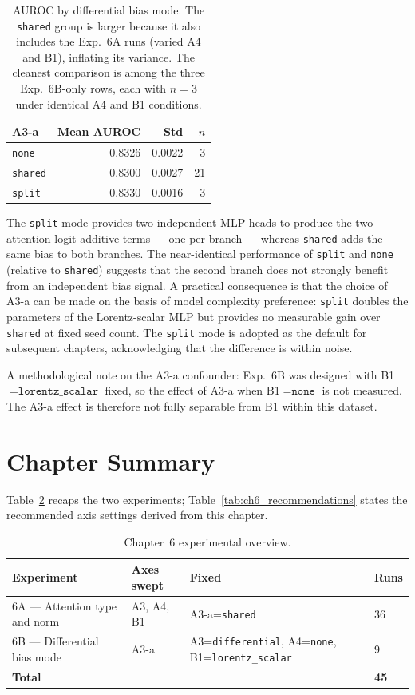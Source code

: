 \begin{table}[h]
\centering\small
\begin{tabular}{lrrr}
\toprule
A3-a & Mean AUROC & Std & $n$ \\
\midrule
\texttt{none}   & 0.8326 & 0.0022 & 3  \\
\texttt{shared} & 0.8300 & 0.0027 & 21 \\
\texttt{split}  & 0.8330 & 0.0016 & 3  \\
\bottomrule
\end{tabular}
\caption{AUROC by differential bias mode. The \texttt{shared} group is larger
  because it also includes the Exp.~6A runs (varied A4 and B1), inflating its
  variance. The cleanest comparison is among the three Exp.~6B-only rows, each
  with $n=3$ under identical A4 and B1 conditions.}
\label{tab:ch6_A3a_results}
\end{table}

The \texttt{split} mode provides two independent MLP heads to produce the two
attention-logit additive terms — one per branch — whereas \texttt{shared} adds the
same bias to both branches. The near-identical performance of \texttt{split} and
\texttt{none} (relative to \texttt{shared}) suggests that the second branch does not
strongly benefit from an independent bias signal. A practical consequence is that the
choice of A3-a can be made on the basis of model complexity preference: \texttt{split}
doubles the parameters of the Lorentz-scalar MLP but provides no measurable gain over
\texttt{shared} at fixed seed count. The \texttt{split} mode is adopted as the default
for subsequent chapters, acknowledging that the difference is within noise.

A methodological note on the A3-a confounder: Exp.~6B was designed with
B1${}=\texttt{lorentz\_scalar}$ fixed, so the effect of A3-a when B1${}=\texttt{none}$
is not measured. The A3-a effect is therefore not fully separable from B1 within this
dataset.

\section{Chapter Summary}
\label{sec:ch6_summary}

Table~\ref{tab:ch6_experiments} recaps the two experiments; Table~\ref{tab:ch6_recommendations}
states the recommended axis settings derived from this chapter.

\begin{table}[h]
\centering\small
\begin{tabular}{llll}
\toprule
Experiment & Axes swept & Fixed & Runs \\
\midrule
6A — Attention type and norm & A3, A4, B1 & A3-a=\texttt{shared} & 36 \\
6B — Differential bias mode  & A3-a & A3=\texttt{differential}, A4=\texttt{none}, B1=\texttt{lorentz\_scalar} & 9 \\
\midrule
\textbf{Total} & & & \textbf{45} \\
\bottomrule
\end{tabular}
\caption{Chapter~6 experimental overview.}
\label{tab:ch6_experiments}
\end{table}

